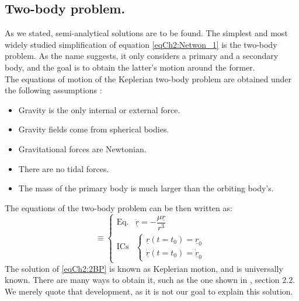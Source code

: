 		\subsection{Two-body problem.}
		\indent As we stated, semi-analytical solutions are to be found. The simplest and most widely studied simplification of equation \eqref{eqCh2:Netwon_1} is the two-body problem. As the name suggests, it only considers a primary and a secondary body, and the goal is to obtain the latter's motion around the former. \\
		\indent The equations of motion of the Keplerian two-body problem are obtained under the following assumptions \cite{SCFormationFlying}:
		\begin{itemize}
		\item[\GMVred{I.}] Gravity is the only internal or external force. 
		\item[\GMVred{II.}] Gravity fields come from spherical bodies.
		\item[\GMVred{III.}] Gravitational forces are Newtonian.
		\item[\GMVred{IV.}] There are no tidal forces.
		\item[\GMVred{V.}] The mass of the primary body is much larger than the orbiting body's.
		\end{itemize}
		\indent The equations of the two-body problem can be then written as:
		\begin{equation}
		[P]\equiv\left\{ \begin{array}{lcc}
		\text{Eq.} &  \ddot{\underline{r}} = -\dfrac{\mu \underline{r}}{r^3}\\[1em]
		\text{ICs} & \left\{ \begin{array}{ll}
		\underline{r} (t = t_0) = \underline{r}_{0} \\
		\dot{\underline{r}} (t = t_0) = \dot{\underline{r}}_{0} 
		\end{array}\right.
		\end{array}\right.
		\label{eqCh2:2BP}
		\end{equation}
		\indent The solution of \eqref{eqCh2:2BP} is known as Keplerian motion, and is universally known. There are many ways to obtain it, such as the one shown in \cite{SCFormationFlying}, section 2.2. We merely quote that development, as it is not our goal to explain this solution.\\
